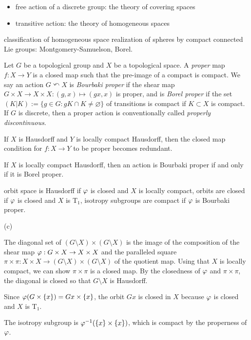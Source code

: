 \documentclass{../../large}
\begin{document}
\begin{itemize}
\item free action of a discrete group: the theory of covering spaces
\item transitive action: the theory of homogeneous spaces
\end{itemize}

classification of homogeneous space realization of spheres by compact connected Lie groups: Montgomery-Samuelson, Borel.





\begin{prb}
Let $G$ be a topological group and $X$ be a topological space.
A \emph{proper} map $f:X\to Y$ is a closed map such that the pre-image of a compact is compact.
We say an action $G\curvearrowleft X$ is \emph{Bourbaki proper} if the shear map $G\times X\to X\times X:(g,x)\mapsto(gx,x)$ is proper, and is \emph{Borel proper} if the set $(K|K):=\{g\in G:gK\cap K\ne\varnothing\}$ of transitions is compact if $K\subset X$ is compact.
If $G$ is discrete, then a proper action is conventionally called \emph{properly discontinuous}.
\begin{parts}
\item If $X$ is Hausdorff and $Y$ is locally compact Hausdorff, then the closed map condition for $f:X\to Y$ to be proper becomes redundant.
\item If $X$ is locally compact Hausdorff, then an action is Bourbaki proper if and only if it is Borel proper.
\item orbit space is Hausdorff if $\varphi$ is closed and $X$ is locally compact, orbits are closed if $\varphi$ is closed and $X$ is T$_1$, isotropy subgroups are compact if $\varphi$ is Bourbaki proper.
\end{parts}
\end{prb}
\begin{pf}
(c)

The diagonal set of $(G\setminus X)\times(G\setminus X)$ is the image of the composition of the shear map $\varphi:G\times X\to X\times X$ and the paralleled square $\pi\times\pi:X\times X\to(G\setminus X)\times(G\setminus X)$ of the quotient map.
Using that $X$ is locally compact, we can show $\pi\times\pi$ is a closed map.
By the closedness of $\varphi$ and $\pi\times\pi$, the diagonal is closed so that $G\setminus X$ is Hausdorff.

Since $\varphi(G\times\{x\})=Gx\times\{x\}$, the orbit $Gx$ is closed in $X$ because $\varphi$ is closed and $X$ is T$_1$.

The isotropy subgroup is $\varphi^{-1}(\{x\}\times\{x\})$, which is compact by the properness of $\varphi$.
\end{pf}
\end{document}
